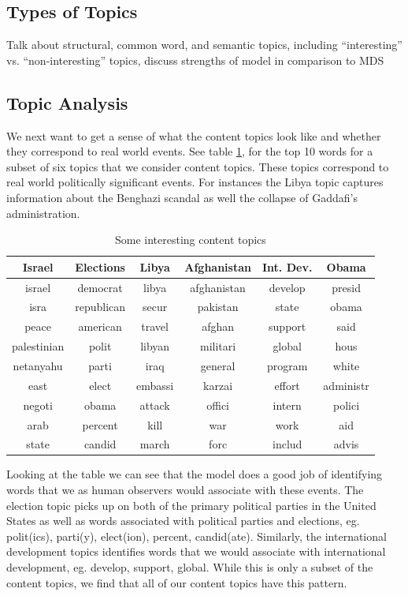 \documentclass[12pt]{article}
\theoremstyle{definition}
\theoremstyle{algodesc}
\begin{document}
\subsection{Types of Topics}
Talk about structural, common word, and semantic topics, including ``interesting'' vs. ``non-interesting'' topics, discuss strengths of model in comparison to MDS

\subsection{Topic Analysis}

We next want to get a sense of what the content topics look like and whether they correspond to real world events.  See table \ref{tab:content_topics}, for the top 10 words for a subset of six topics that we consider content topics.  These topics correspond to real world politically significant events.  For instances the Libya topic captures information about the Benghazi scandal as well the collapse of Gaddafi's administration.

\begin{table}[h] \centering
\begin{tabular}{cccccc}
  \toprule
  Israel & Elections & Libya & Afghanistan & Int. Dev. & Obama \\
  \midrule
  israel & democrat & libya & afghanistan & develop & presid \\
  isra & republican & secur & pakistan & state & obama \\
  peace & american & travel & afghan & support & said \\
  palestinian & polit & libyan & militari & global & hous \\
  netanyahu & parti & iraq & general & program & white \\
  east & elect & embassi & karzai & effort & administr \\
  negoti & obama & attack & offici & intern & polici \\
  arab & percent & kill & war & work & aid \\
  state & candid & march & forc & includ & advis \\
  \bottomrule
\end{tabular}
\caption{Some interesting content topics}
\label{tab:content_topics}
\end{table}

Looking at the table we can see that the model does a good job of identifying words that we as human observers would associate with these events.  The election topic picks up on both of the primary political parties in the United States as well as words associated with political parties and elections, eg. polit(ics), parti(y), elect(ion), percent, candid(ate).  Similarly, the international development topics identifies words that we would associate with international development, eg. develop, support, global.  While this is only a subset of the content topics, we find that all of our content topics have this pattern.
\end{document}
